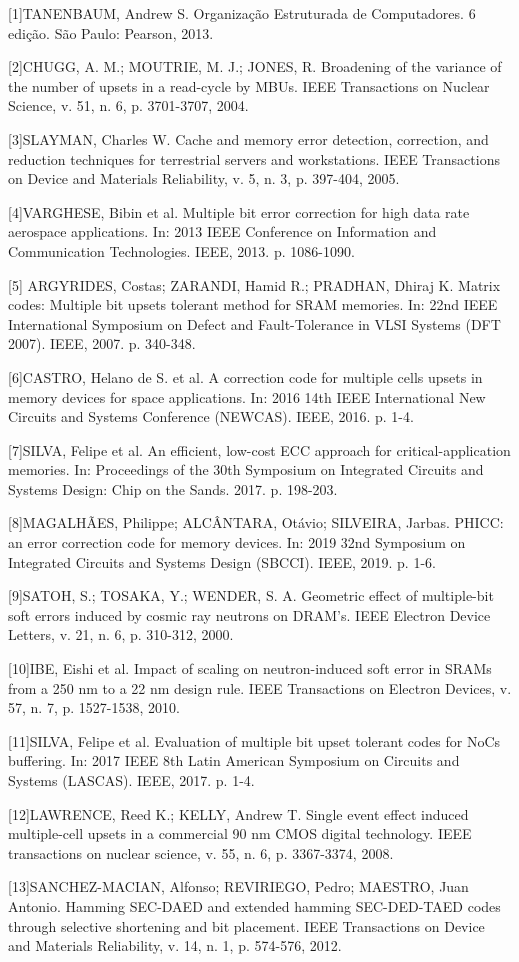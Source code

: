 
[1]TANENBAUM, Andrew S. Organização Estruturada de Computadores. 6 edição. São Paulo: Pearson, 2013.

[2]CHUGG, A. M.; MOUTRIE, M. J.; JONES, R. Broadening of the variance of the number of upsets in a read-cycle by MBUs. IEEE Transactions on Nuclear Science, v. 51, n. 6, p. 3701-3707, 2004.

[3]SLAYMAN, Charles W. Cache and memory error detection, correction, and reduction techniques for terrestrial servers and workstations. IEEE Transactions on Device and Materials Reliability, v. 5, n. 3, p. 397-404, 2005.

[4]VARGHESE, Bibin et al. Multiple bit error correction for high data rate aerospace applications. In: 2013 IEEE Conference on Information and Communication Technologies. IEEE, 2013. p. 1086-1090.

[5] ARGYRIDES, Costas; ZARANDI, Hamid R.; PRADHAN, Dhiraj K. Matrix codes: Multiple bit upsets tolerant method for SRAM memories. In: 22nd IEEE International Symposium on Defect and Fault-Tolerance in VLSI Systems (DFT 2007). IEEE, 2007. p. 340-348.

[6]CASTRO, Helano de S. et al. A correction code for multiple cells upsets in memory devices for space applications. In: 2016 14th IEEE International New Circuits and Systems Conference (NEWCAS). IEEE, 2016. p. 1-4.

[7]SILVA, Felipe et al. An efficient, low-cost ECC approach for critical-application memories. In: Proceedings of the 30th Symposium on Integrated Circuits and Systems Design: Chip on the Sands. 2017. p. 198-203.

[8]MAGALHÃES, Philippe; ALCÂNTARA, Otávio; SILVEIRA, Jarbas. PHICC: an error correction code for memory devices. In: 2019 32nd Symposium on Integrated Circuits and Systems Design (SBCCI). IEEE, 2019. p. 1-6.

[9]SATOH, S.; TOSAKA, Y.; WENDER, S. A. Geometric effect of multiple-bit soft errors induced by cosmic ray neutrons on DRAM's. IEEE Electron Device Letters, v. 21, n. 6, p. 310-312, 2000.

[10]IBE, Eishi et al. Impact of scaling on neutron-induced soft error in SRAMs from a 250 nm to a 22 nm design rule. IEEE Transactions on Electron Devices, v. 57, n. 7, p. 1527-1538, 2010.

[11]SILVA, Felipe et al. Evaluation of multiple bit upset tolerant codes for NoCs buffering. In: 2017 IEEE 8th Latin American Symposium on Circuits and Systems (LASCAS). IEEE, 2017. p. 1-4.

[12]LAWRENCE, Reed K.; KELLY, Andrew T. Single event effect induced multiple-cell upsets in a commercial 90 nm CMOS digital technology. IEEE transactions on nuclear science, v. 55, n. 6, p. 3367-3374, 2008.

[13]SANCHEZ-MACIAN, Alfonso; REVIRIEGO, Pedro; MAESTRO, Juan Antonio. Hamming SEC-DAED and extended hamming SEC-DED-TAED codes through selective shortening and bit placement. IEEE Transactions on Device and Materials Reliability, v. 14, n. 1, p. 574-576, 2012.